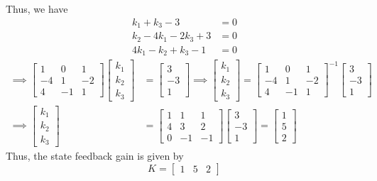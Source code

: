Thus, we have
\begin{align*}
    k_1 + k_3 - 3         & = 0 \\
    k_2 - 4k_1 - 2k_3 + 3 & = 0 \\
    4k_1 - k_2 + k_3 - 1  & = 0
\end{align*}
\begin{align*}
    \implies
    \begin{bmatrix}
        1  & 0  & 1  \\
        -4 & 1  & -2 \\
        4  & -1 & 1
    \end{bmatrix}
    \begin{bmatrix}
        k_1 \\
        k_2 \\
        k_3
    \end{bmatrix}
     & =
    \begin{bmatrix}
        3  \\
        -3 \\
        1
    \end{bmatrix}
    \implies
    \begin{bmatrix}
        k_1 \\
        k_2 \\
        k_3
    \end{bmatrix}
    =
    \begin{bmatrix}
        1  & 0  & 1  \\
        -4 & 1  & -2 \\
        4  & -1 & 1
    \end{bmatrix}^{-1}
    \begin{bmatrix}
        3  \\
        -3 \\
        1
    \end{bmatrix}
    \\
    \implies
    \begin{bmatrix}
        k_1 \\
        k_2 \\
        k_3
    \end{bmatrix}
     & =
    \begin{bmatrix}
        1 & 1  & 1  \\
        4 & 3  & 2  \\
        0 & -1 & -1
    \end{bmatrix}
    \begin{bmatrix}
        3  \\
        -3 \\
        1
    \end{bmatrix}
    =
    \begin{bmatrix}
        1 \\
        5 \\
        2
    \end{bmatrix}
\end{align*}
Thus, the state feedback gain is given by
\begin{equation*}
    \boxed{
        K
        =
        \begin{bmatrix}
            1 & 5 & 2
        \end{bmatrix}
    }
\end{equation*}

